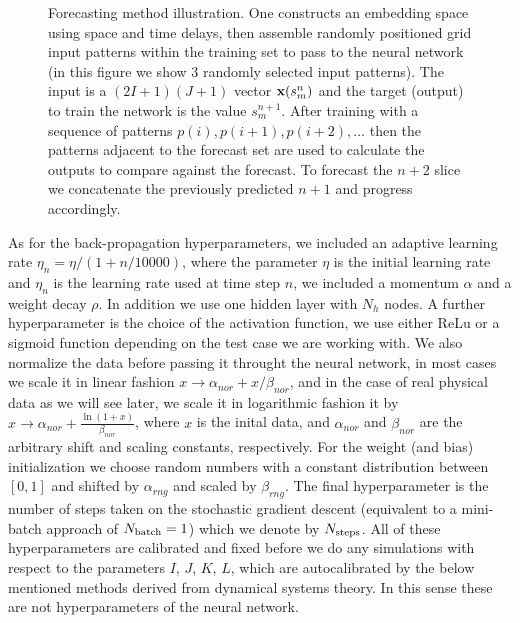 \documentclass[journal]{IEEEtran}
\begin{document}
\begin{figure}
\centering
{}
\caption{Forecasting method illustration. One constructs an embedding space using
space and time delays, then assemble randomly positioned grid input patterns within the training set to pass to the neural network (in this figure
we show 3 randomly selected input patterns).
The input is a
$(2 I+1)(J+1)$ vector ${\bf x}(s^n_m)$ and the target (output) to train the network is the value $s^{n+1}_{m}$.
After training with a sequence
of patterns $p(i), p(i+1), p(i+2), \ldots$ then the patterns adjacent to the forecast set are used to calculate the outputs
to compare against the forecast. To forecast the $n+2$ slice we concatenate the previously predicted $n+1$ and progress accordingly.}
\label{NeuralNetwork}
\end{figure}

As for the back-propagation hyperparameters, we included an adaptive learning rate $\eta_n=\eta/(1+n/10000)$, where the parameter $\eta$ is the initial learning rate and $\eta_n$ is the learning rate used at time step
$n$, we included a momentum $\alpha$ and a weight decay $\rho$.
In addition we use one hidden layer with $N_h$ nodes. A further  hyperparameter is the choice of the activation function, we use either ReLu or a sigmoid function depending on the
 test case we are working with.
We also normalize the data before passing it throught the neural network, in most cases we scale it in linear fashion
$x \to \alpha_{nor} + x/\beta_{nor}$, and in the case of real physical data as we will see later, we scale it in logarithmic fashion it by $x \to \alpha_{nor}+\frac{\ln(1+x)}{\beta_{nor}}$, where $x$ is the inital data,
and $\alpha_{nor}$ and $\beta_{nor}$ are the arbitrary shift and scaling constants, respectively. For the weight (and bias)
initialization we choose random numbers with a constant distribution between $[0,1]$ and shifted by $\alpha_{rng}$ and scaled
by $\beta_{rng}$. The final hyperparameter is the number of steps taken on the stochastic gradient descent (equivalent to a mini-batch approach of $N_{\textnormal{batch}}=1$) which we denote by $N_{\textnormal{steps}}$.  All of these hyperparameters are calibrated and fixed
before we do any simulations with respect to the parameters $I$, $J$, $K$, $L$, which are autocalibrated by the below mentioned
methods derived from dynamical systems theory. In this sense these are not hyperparameters of the neural network.
\end{document}
